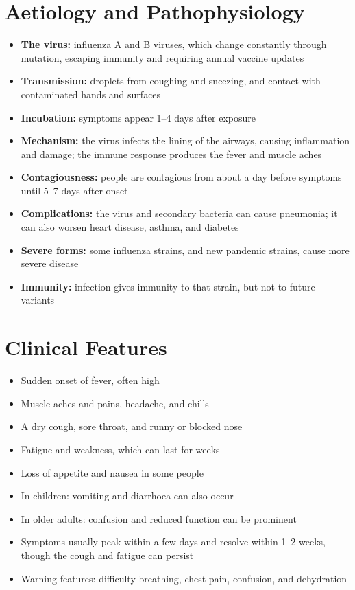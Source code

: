 \section*{Aetiology and Pathophysiology}
\begin{itemize}
    \item \textbf{The virus:} influenza A and B viruses, which change constantly through mutation, escaping immunity and requiring annual vaccine updates
    \item \textbf{Transmission:} droplets from coughing and sneezing, and contact with contaminated hands and surfaces
    \item \textbf{Incubation:} symptoms appear 1--4 days after exposure
    \item \textbf{Mechanism:} the virus infects the lining of the airways, causing inflammation and damage; the immune response produces the fever and muscle aches
    \item \textbf{Contagiousness:} people are contagious from about a day before symptoms until 5--7 days after onset
    \item \textbf{Complications:} the virus and secondary bacteria can cause pneumonia; it can also worsen heart disease, asthma, and diabetes
    \item \textbf{Severe forms:} some influenza strains, and new pandemic strains, cause more severe disease
    \item \textbf{Immunity:} infection gives immunity to that strain, but not to future variants
\end{itemize}

\section*{Clinical Features}
\begin{itemize}
    \item Sudden onset of fever, often high
    \item Muscle aches and pains, headache, and chills
    \item A dry cough, sore throat, and runny or blocked nose
    \item Fatigue and weakness, which can last for weeks
    \item Loss of appetite and nausea in some people
    \item In children: vomiting and diarrhoea can also occur
    \item In older adults: confusion and reduced function can be prominent
    \item Symptoms usually peak within a few days and resolve within 1--2 weeks, though the cough and fatigue can persist
    \item Warning features: difficulty breathing, chest pain, confusion, and dehydration
\end{itemize}

